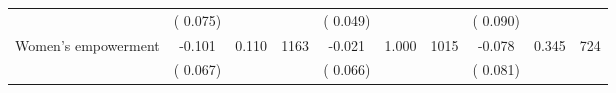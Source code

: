 \begin{tabular}{l*{9}{c}}
                               &        (       0.075) & &                                                                &       (       0.049) & &                                                         &       (       0.090) & & \\ 
 Women's empowerment                &             -0.101        &        0.110 & 1163        &             -0.021 &        1.000 & 1015               &       -0.078 &        0.345 & 724       \\ 
                               &        (       0.067) & &                                                                &       (       0.066) & &                                                         &       (       0.081) & & \\ 
\hline \end{tabular}                                                                                                                                                      